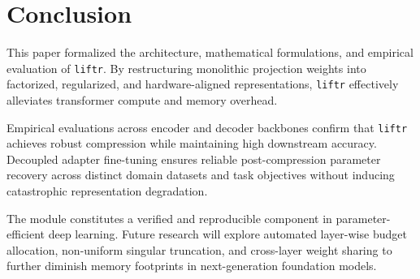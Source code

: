 \section{Conclusion}
This paper formalized the architecture, mathematical formulations, and empirical evaluation of \texttt{liftr}. By restructuring monolithic projection weights into factorized, regularized, and hardware-aligned representations, \texttt{liftr} effectively alleviates transformer compute and memory overhead.

Empirical evaluations across encoder and decoder backbones confirm that \texttt{liftr} achieves robust compression while maintaining high downstream accuracy. Decoupled adapter fine-tuning ensures reliable post-compression parameter recovery across distinct domain datasets and task objectives without inducing catastrophic representation degradation.

The module constitutes a verified and reproducible component in parameter-efficient deep learning. Future research will explore automated layer-wise budget allocation, non-uniform singular truncation, and cross-layer weight sharing to further diminish memory footprints in next-generation foundation models.
